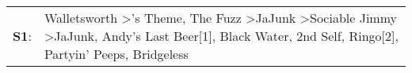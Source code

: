 \begin{supertabular}{p{0.03\textwidth}p{0.92\textwidth}}
 \textbf{S1}:  &  Walletsworth\textsuperscript{} \textgreater {}'s Theme\textsuperscript{}, \enspace The Fuzz\textsuperscript{} \textgreater \enspace JaJunk\textsuperscript{} \textgreater \enspace Sociable Jimmy\textsuperscript{} \textgreater \enspace JaJunk\textsuperscript{}, \enspace Andy's Last Beer[1]\textsuperscript{}, \enspace Black Water\textsuperscript{}, \enspace 2nd Self\textsuperscript{}, \enspace Ringo[2]\textsuperscript{}, \enspace Partyin' Peeps\textsuperscript{}, \enspace Bridgeless\textsuperscript{}  \enspace  \\
\end{supertabular}
